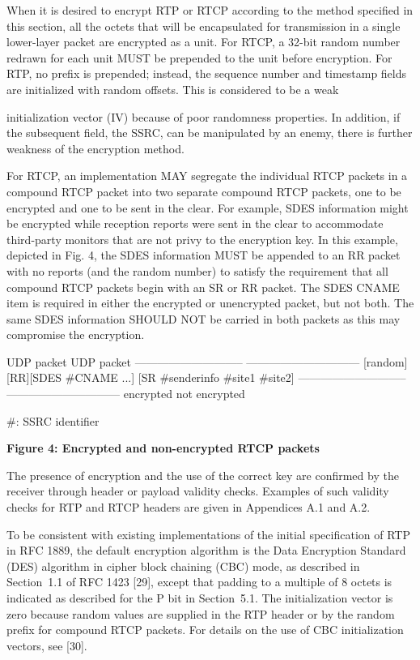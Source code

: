 \documentclass{article}
\begin{document}
When it is desired to encrypt RTP or RTCP according to the method specified in this section, all the octets that will be encapsulated for transmission in a single lower-layer packet are encrypted as a unit.  For RTCP, a 32-bit random number redrawn for each unit MUST be prepended to the unit before encryption.  For RTP, no prefix is prepended; instead, the sequence number and timestamp fields are initialized with random offsets.  This is considered to be a weak

initialization vector (IV) because of poor randomness properties.  In addition, if the subsequent field, the SSRC, can be manipulated by an enemy, there is further weakness of the encryption method.

For RTCP, an implementation MAY segregate the individual RTCP packets in a compound RTCP packet into two separate compound RTCP packets, one to be encrypted and one to be sent in the clear.  For example, SDES information might be encrypted while reception reports were sent in the clear to accommodate third-party monitors that are not privy to the encryption key.  In this example, depicted in Fig. 4, the SDES information MUST be appended to an RR packet with no reports (and the random number) to satisfy the requirement that all compound RTCP packets begin with an SR or RR packet.  The SDES CNAME item is required in either the encrypted or unencrypted packet, but not both. The same SDES information SHOULD NOT be carried in both packets as this may compromise the encryption.

UDP packet                     UDP packet -----------------------------  ------------------------------ [random][RR][SDES \#CNAME ...]  [SR \#senderinfo \#site1 \#site2] -----------------------------  ------------------------------ encrypted                     not encrypted

\#: SSRC identifier

\begin{center}
\textbf{Figure 4: Encrypted and non-encrypted RTCP packets}
\end{center}

The presence of encryption and the use of the correct key are confirmed by the receiver through header or payload validity checks. Examples of such validity checks for RTP and RTCP headers are given in Appendices A.1 and A.2.

To be consistent with existing implementations of the initial specification of RTP in RFC 1889, the default encryption algorithm is the Data Encryption Standard (DES) algorithm in cipher block chaining (CBC) mode, as described in Section~1.1 of RFC 1423 [29], except that padding to a multiple of 8 octets is indicated as described for the P bit in Section~5.1.  The initialization vector is zero because random values are supplied in the RTP header or by the random prefix for compound RTCP packets.  For details on the use of CBC initialization vectors, see [30].
\end{document}
